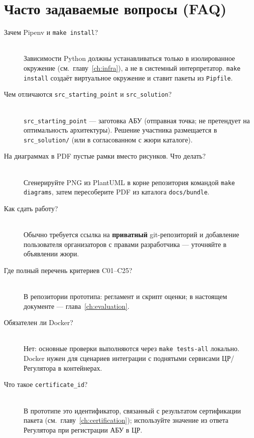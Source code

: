 \chapter{Часто задаваемые вопросы (FAQ)}
\label{ch:faq}

\begin{description}
  \item[Зачем Pipenv и \texttt{make install}?]\hfill\\
  Зависимости Python должны устанавливаться только в изолированное окружение (см.\ главу~\ref{ch:infra}), а не в системный интерпретатор. \texttt{make install} создаёт виртуальное окружение и ставит пакеты из \texttt{Pipfile}.

  \item[Чем отличаются \texttt{src\_starting\_point} и \texttt{src\_solution}?]\hfill\\
  \texttt{src\_starting\_point} --- заготовка АБУ (отправная точка; не претендует на оптимальность архитектуры). Решение участника размещается в \texttt{src\_solution/} (или в согласованном с жюри каталоге).

  \item[На диаграммах в PDF пустые рамки вместо рисунков. Что делать?]\hfill\\
  Сгенерируйте PNG из PlantUML в корне репозитория командой \texttt{make diagrams}, затем пересоберите PDF из каталога \texttt{docs/bundle}.

  \item[Как сдать работу?]\hfill\\
  Обычно требуется ссылка на \textbf{приватный} git-репозиторий и добавление пользователя организаторов с правами разработчика --- уточняйте в объявлении жюри.

  \item[Где полный перечень критериев C01--C25?]\hfill\\
  В репозитории прототипа: регламент и скрипт оценки; в настоящем документе --- глава~\ref{ch:evaluation}.

  \item[Обязателен ли Docker?]\hfill\\
  Нет: основные проверки выполняются через \texttt{make tests-all} локально. Docker нужен для сценариев интеграции с поднятыми сервисами ЦР/Регулятора в контейнерах.

  \item[Что такое \texttt{certificate\_id}?]\hfill\\
  В прототипе это идентификатор, связанный с результатом сертификации пакета (см.\ главу~\ref{ch:certification}); используйте значение из ответа Регулятора при регистрации АБУ в ЦР.
\end{description}
